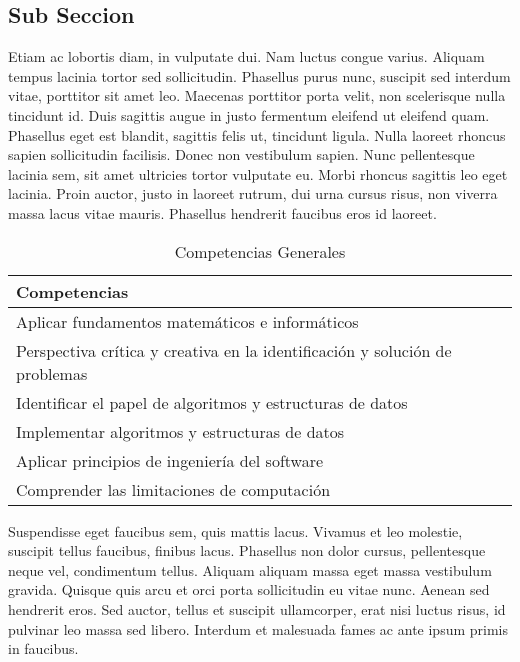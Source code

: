 \subsection{Sub Seccion}


Etiam ac lobortis diam, in vulputate dui. Nam luctus congue varius. Aliquam tempus lacinia tortor sed sollicitudin. Phasellus purus nunc, suscipit sed interdum vitae, porttitor sit amet leo. Maecenas porttitor porta velit, non scelerisque nulla tincidunt id. Duis sagittis augue in justo fermentum eleifend ut eleifend quam. Phasellus eget est blandit, sagittis felis ut, tincidunt ligula. Nulla laoreet rhoncus sapien sollicitudin facilisis. Donec non vestibulum sapien. Nunc pellentesque lacinia sem, sit amet ultricies tortor vulputate eu. Morbi rhoncus sagittis leo eget lacinia. Proin auctor, justo in laoreet rutrum, dui urna cursus risus, non viverra massa lacus vitae mauris. Phasellus hendrerit faucibus eros id laoreet.


\begin{table}[h]
\centering
\caption{Competencias Generales}
\begin{tabular}[t]{l}
\hline
Competencias\\
\hline
Aplicar fundamentos matemáticos e informáticos\\
Perspectiva crítica y creativa en la identificación y solución de problemas\\
Identificar el papel de algoritmos y estructuras de datos\\
Implementar algoritmos y estructuras de datos\\
Aplicar principios de ingeniería del software\\
Comprender las limitaciones de computación\\
\hline
\end{tabular}
\label{tab:compgen1}
\end{table}

Suspendisse eget faucibus sem, quis mattis lacus. Vivamus et leo molestie, suscipit tellus faucibus, finibus lacus. Phasellus non dolor cursus, pellentesque neque vel, condimentum tellus. Aliquam aliquam massa eget massa vestibulum gravida. Quisque quis arcu et orci porta sollicitudin eu vitae nunc. Aenean sed hendrerit eros. Sed auctor, tellus et suscipit ullamcorper, erat nisi luctus risus, id pulvinar leo massa sed libero. Interdum et malesuada fames ac ante ipsum primis in faucibus.


